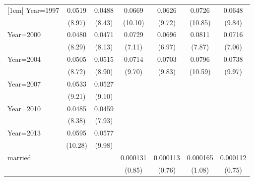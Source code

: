 \begin{table}[htbp]
\begin{tabular}{l*{6}{c}}
[1em]
Year=1997           &      0.0519\sym{***}&      0.0488\sym{***}&      0.0669\sym{***}&      0.0626\sym{***}&      0.0726\sym{***}&      0.0648\sym{***}\\
                    &      (8.97)         &      (8.43)         &     (10.10)         &      (9.72)         &     (10.85)         &      (9.84)         \\
[1em]
Year=2000           &      0.0480\sym{***}&      0.0471\sym{***}&      0.0729\sym{***}&      0.0696\sym{***}&      0.0811\sym{***}&      0.0716\sym{***}\\
                    &      (8.29)         &      (8.13)         &      (7.11)         &      (6.97)         &      (7.87)         &      (7.06)         \\
[1em]
Year=2004           &      0.0505\sym{***}&      0.0515\sym{***}&      0.0714\sym{***}&      0.0703\sym{***}&      0.0796\sym{***}&      0.0738\sym{***}\\
                    &      (8.72)         &      (8.90)         &      (9.70)         &      (9.83)         &     (10.59)         &      (9.97)         \\
[1em]
Year=2007           &      0.0533\sym{***}&      0.0527\sym{***}&                     &                     &                     &                     \\
                    &      (9.21)         &      (9.10)         &                     &                     &                     &                     \\
[1em]
Year=2010           &      0.0485\sym{***}&      0.0459\sym{***}&                     &                     &                     &                     \\
                    &      (8.38)         &      (7.93)         &                     &                     &                     &                     \\
[1em]
Year=2013           &      0.0595\sym{***}&      0.0577\sym{***}&                     &                     &                     &                     \\
                    &     (10.28)         &      (9.98)         &                     &                     &                     &                     \\
[1em]
married             &                     &                     &    0.000131         &    0.000113         &    0.000165         &    0.000112         \\
                    &                     &                     &      (0.85)         &      (0.76)         &      (1.08)         &      (0.75)         \\

\end{tabular}
\end{table}
